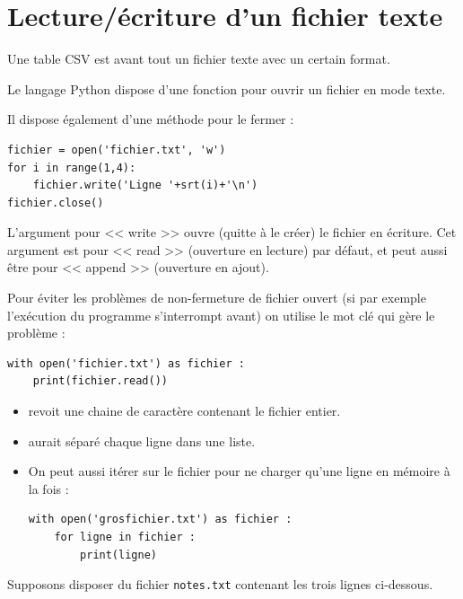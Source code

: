 \section{Lecture/écriture d'un fichier texte}

Une table CSV est avant tout un fichier texte avec un certain format. 

Le langage Python dispose d'une fonction  pour ouvrir un fichier en mode texte. 

Il dispose également d'une méthode  pour le fermer :

\begin{multicols}{2}
\begin{verbatim}
fichier = open('fichier.txt', 'w')
for i in range(1,4):
    fichier.write('Ligne '+srt(i)+'\n')
fichier.close()
\end{verbatim}

L'argument  pour << write >> ouvre (quitte à le créer) le fichier en écriture. Cet argument est  pour << read >> (ouverture en lecture) par défaut, et peut aussi être  pour << append >> (ouverture en ajout).
\end{multicols}

Pour éviter les problèmes de non-fermeture de fichier ouvert (si par exemple l'exécution du programme s'interrompt avant) on utilise le mot clé  qui gère le problème :

\begin{verbatim}
with open('fichier.txt') as fichier :
    print(fichier.read())
\end{verbatim}

\begin{itemize}
	\item {} revoit une chaine de caractère contenant le fichier entier.
	\item {} aurait séparé chaque ligne dans une liste.
	
	\item On peut aussi itérer sur le fichier pour ne charger qu'une ligne en mémoire à la fois :

\begin{verbatim}
with open('grosfichier.txt') as fichier :
    for ligne in fichier :
        print(ligne)
\end{verbatim}
\end{itemize}


Supposons disposer du fichier \texttt{notes.txt} contenant les trois lignes ci-dessous.

